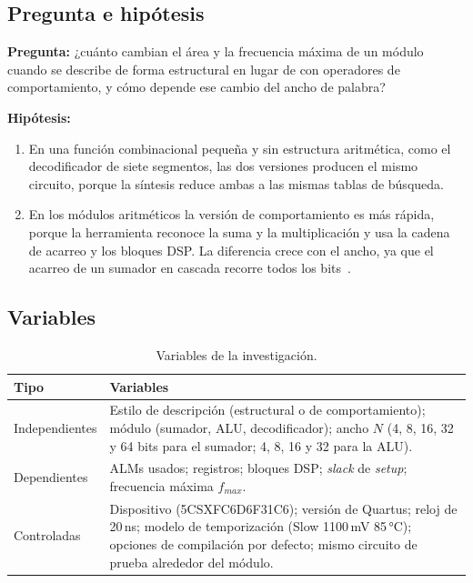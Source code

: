 \documentclass[11pt,letterpaper]{article}
\begin{document}
\subsection{Pregunta e hipótesis}

\textbf{Pregunta:} ¿cuánto cambian el área y la frecuencia máxima de un módulo cuando se describe
de forma estructural en lugar de con operadores de comportamiento, y cómo depende ese cambio del
ancho de palabra?

\textbf{Hipótesis:}
\begin{enumerate}
    \item[H1.] En una función combinacional pequeña y sin estructura aritmética, como el
    decodificador de siete segmentos, las dos versiones producen el mismo circuito, porque la
    síntesis reduce ambas a las mismas tablas de búsqueda.
    \item[H2.] En los módulos aritméticos la versión de comportamiento es más rápida, porque la
    herramienta reconoce la suma y la multiplicación y usa la cadena de acarreo y los bloques DSP.
    La diferencia crece con el ancho, ya que el acarreo de un sumador en cascada recorre todos los
    bits~\cite{harris}.
\end{enumerate}

\subsection{Variables}

\begin{table}[H]
\centering
\caption{Variables de la investigación.}
\label{tab:variables}
\begin{tabular}{p{3.2cm}p{11cm}}
\toprule
Tipo & Variables \\
\midrule
Independientes & Estilo de descripción (estructural o de comportamiento); módulo (sumador, ALU,
decodificador); ancho $N$ (4, 8, 16, 32 y 64 bits para el sumador; 4, 8, 16 y 32 para la ALU). \\
Dependientes & ALMs usados; registros; bloques DSP; \emph{slack} de \emph{setup}; frecuencia
máxima $f_{max}$. \\
Controladas & Dispositivo (5CSXFC6D6F31C6); versión de Quartus; reloj de 20\,ns; modelo de
temporización (Slow 1100\,mV 85\,°C); opciones de compilación por defecto; mismo circuito de
prueba alrededor del módulo. \\
\bottomrule
\end{tabular}
\end{table}
\end{document}
